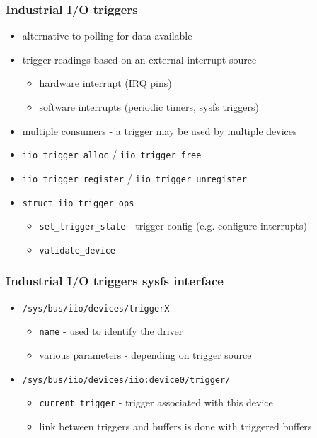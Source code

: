 \documentclass[aspectratio=169]{beamer}
\begin{document}
\begin{frame}
\frametitle{Industrial I/O triggers}
\begin{itemize}
    \item alternative to polling for data available
    \item trigger readings based on an external interrupt source
    \begin {itemize}
        \item hardware interrupt (IRQ pins)
        \item software interrupts (periodic timers, sysfs triggers)
    \end{itemize}
    \item multiple consumers - a trigger may be used by multiple devices
    \item \texttt{iio\_trigger\_alloc} / \texttt{iio\_trigger\_free}
    \item \texttt{iio\_trigger\_register} / \texttt{iio\_trigger\_unregister}
    \item \texttt{struct iio\_trigger\_ops}
    \begin{itemize}
        \item \texttt{set\_trigger\_state} - trigger config (e.g. configure interrupts)
        \item \texttt{validate\_device}
    \end{itemize}
\end{itemize}
\end{frame}


\begin{frame}
\frametitle{Industrial I/O triggers sysfs interface}
\begin{itemize}
    \item \texttt{/sys/bus/iio/devices/triggerX}
    \begin{itemize}
        \item \texttt{name} - used to identify the driver
        \item various parameters - depending on trigger source
    \end{itemize}
    \item \texttt{/sys/bus/iio/devices/iio:device0/trigger/}
    \begin{itemize}
        \item \texttt{current\_trigger} - trigger associated with this device
        \item link between triggers and buffers is done with triggered buffers
    \end{itemize}
\end{itemize}
\end{frame}
\end{document}
